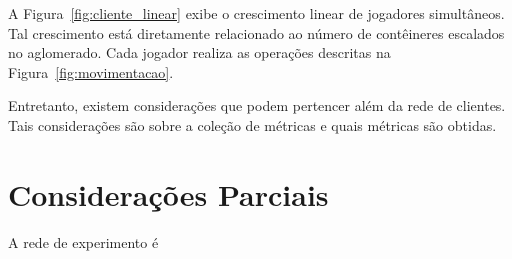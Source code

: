 A Figura~\ref{fig:cliente_linear} exibe o crescimento linear de jogadores simultâneos.
%
Tal crescimento está diretamente relacionado ao número de contêineres escalados no aglomerado.
%
Cada jogador realiza as operações descritas na Figura~\ref{fig:movimentacao}.

Entretanto, existem considerações que podem pertencer além da rede de clientes.
%
Tais considerações são sobre a coleção de métricas e quais métricas são obtidas.

\section{Considerações Parciais}

A rede de experimento é
